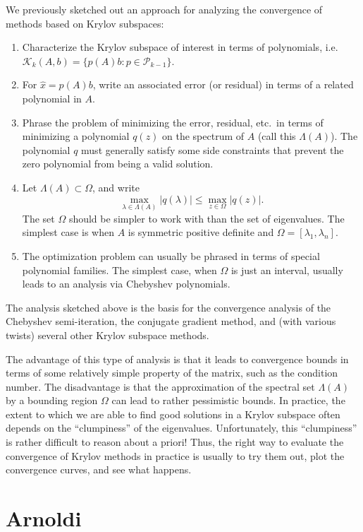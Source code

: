 \documentclass[12pt, leqno]{article} %
\begin{document}
We previously sketched out an approach for analyzing the convergence of
methods based on Krylov subspaces:
\begin{enumerate}
\item
  Characterize the Krylov subspace of interest in terms of polynomials,
  i.e. $\mathcal{K}_k(A,b) = \{ p(A)b : p \in \mathcal{P}_{k-1} \}$.
\item
  For $\hat{x} = p(A) b$, write an associated error (or residual)
  in terms of a related polynomial in $A$.
\item
  Phrase the problem of minimizing the error, residual, etc.~in terms
  of minimizing a polynomial $q(z)$ on the spectrum of $A$
  (call this $\Lambda(A)$).  The polynomial $q$ must generally satisfy
  some side constraints that prevent the zero polynomial from being
  a valid solution.
\item
  Let $\Lambda(A) \subset \Omega$, and write
  \[
    \max_{\lambda \in \Lambda(A)} |q(\lambda)| \leq
    \max_{z \in \Omega} |q(z)|.
  \]
  The set $\Omega$ should be simpler to work with than the set of
  eigenvalues.  The simplest case is when $A$ is symmetric positive
  definite and $\Omega = [\lambda_1, \lambda_n]$.
\item
  The optimization problem can usually be phrased in terms of special
  polynomial families.  The simplest case, when $\Omega$ is just an
  interval, usually leads to an analysis via Chebyshev polynomials.
\end{enumerate}
The analysis sketched above is the basis for the convergence analysis
of the Chebyshev semi-iteration, the conjugate gradient method, and
(with various twists) several other Krylov subspace methods.

The advantage of this type of analysis is that it leads to convergence
bounds in terms of some relatively simple property of the matrix, such
as the condition number.  The disadvantage is that the approximation of
the spectral set $\Lambda(A)$ by a bounding region $\Omega$ can lead to
rather pessimistic bounds.  In practice, the extent to which we are able
to find good solutions in a Krylov subspace often depends on the
``clumpiness'' of the eigenvalues.  Unfortunately, this ``clumpiness''
is rather difficult to reason about a priori!  Thus, the right way to evaluate
the convergence of Krylov methods in practice is usually to try them out,
plot the convergence curves, and see what happens.

\section{Arnoldi}
\end{document}
